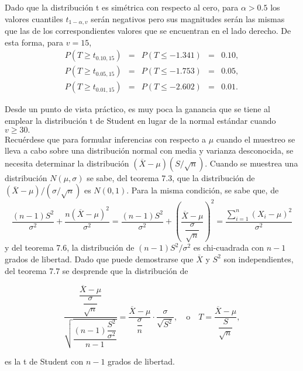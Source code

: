 Dado que la distribución t es simétrica con respecto al cero, para $\alpha>0.5$ los valores cuantiles $t_{1-\alpha,v}$ serán negativos pero sus magnitudes serán las mismas que las de los correspondientes valores que se encuentran en el lado derecho. De esta forma, para $v=15$,
$$
\begin{array}{rclcl}
	P(T\geq t_{0.10,15})&=&P(T\leq -1.341)&=&0.10,\\
	P(T\geq t_{0.05,15})&=&P(T\leq -1.753)&=&0.05,\\
	P(T\geq t_{0.01,15})&=&P(T\leq -2.602)&=&0.01.
\end{array}
$$

Desde un punto de vista práctico, es muy poca la ganancia que se tiene al emplear la distribución t de Student en lugar de la normal estándar cuando $v\geq 30.$\\

Recuérdese que para formular inferencias con respecto a $\mu$ cuando el muestreo se lleva a cabo sobre una distribución normal con media y varianza desconocida, se necesita determinar la distribución $(\overline{X}-\mu)(S/\sqrt{n})$. Cuando se muestrea una distribución $N(\mu,\sigma)$ se sabe, del teorema 7.3, que la distribución de $(\overline{X}-\mu)/(\sigma/\sqrt{n})$ es $N(0,1)$. Para la misma condición, se sabe que, de 
$$\dfrac{(n-1)S^2}{\sigma^2}+\dfrac{n\left(\overline{X}-\mu\right)^2}{\sigma^2}=\dfrac{(n-1)S^2}{\sigma^2}+\left(\dfrac{\overline{X}-\mu}{\dfrac{\sigma}{\sqrt{n}}}\right)^2=\dfrac{\displaystyle\sum_{i=1}^n \left(X_i-\mu\right)^2}{\sigma^2}$$
y del teorema 7.6, la distribución de $(n-1)S^2/\sigma^2$ es chi-cuadrada con $n-1$ grados de libertad. Dado que puede demostrarse que $\overline{X}$ y $S^2$ son independientes, del teorema 7.7 se desprende que la distribución de 
\begin{tcolorbox}
    $$
    \dfrac{\dfrac{\overline{X}-\mu}{\dfrac{\sigma}{\sqrt{n}}}}{\sqrt{\dfrac{(n-1)\dfrac{S^2}{\sigma^2}}{n-1}}}=\dfrac{\overline{X}-\mu}{\dfrac{\sigma}{n}}\cdot \dfrac{\sigma}{\sqrt{S^2}},\quad \mbox{o}\quad T=\dfrac{\overline{X}-\mu}{\dfrac{S}{\sqrt{n}}},
    $$
\end{tcolorbox}
    es la t de Student con $n-1$ grados de libertad.


